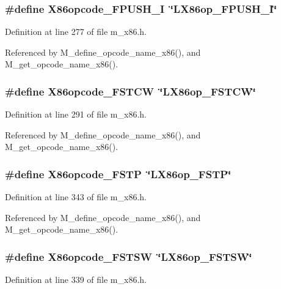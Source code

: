 \subsubsection{\setlength{\rightskip}{0pt plus 5cm}\#define X86opcode\_\-FPUSH\_\-I~\char`\"{}LX86op\_\-FPUSH\_\-I\char`\"{}}\label{m__x86_8h_99b5c2c9b4c25f9b103ffdc57ed3321b}




Definition at line 277 of file m\_\-x86.h.

Referenced by M\_\-define\_\-opcode\_\-name\_\-x86(), and M\_\-get\_\-opcode\_\-name\_\-x86().
\subsubsection{\setlength{\rightskip}{0pt plus 5cm}\#define X86opcode\_\-FSTCW~\char`\"{}LX86op\_\-FSTCW\char`\"{}}\label{m__x86_8h_cd37381cea18bc2e6b97515e8de20962}




Definition at line 291 of file m\_\-x86.h.

Referenced by M\_\-define\_\-opcode\_\-name\_\-x86(), and M\_\-get\_\-opcode\_\-name\_\-x86().
\subsubsection{\setlength{\rightskip}{0pt plus 5cm}\#define X86opcode\_\-FSTP~\char`\"{}LX86op\_\-FSTP\char`\"{}}\label{m__x86_8h_1b8ef10a41dc67d2738287b09a61aae7}




Definition at line 343 of file m\_\-x86.h.

Referenced by M\_\-define\_\-opcode\_\-name\_\-x86(), and M\_\-get\_\-opcode\_\-name\_\-x86().
\subsubsection{\setlength{\rightskip}{0pt plus 5cm}\#define X86opcode\_\-FSTSW~\char`\"{}LX86op\_\-FSTSW\char`\"{}}\label{m__x86_8h_49c379ce9b4aa9ac6586dcba86bdcb74}




Definition at line 339 of file m\_\-x86.h.

